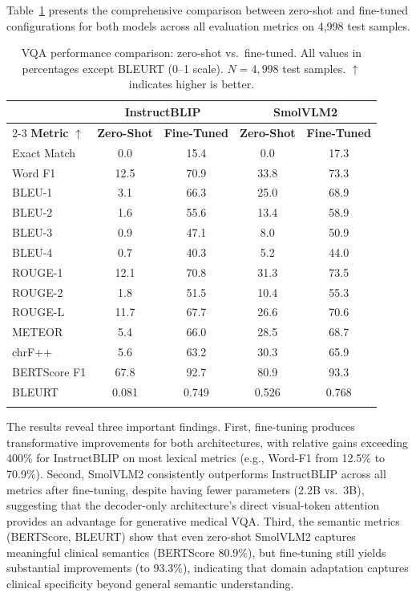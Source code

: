 \documentclass[pdflatex,sn-mathphys-num]{sn-jnl}
\begin{document}
Table~\ref{tab:main_results} presents the comprehensive comparison between zero-shot and fine-tuned configurations for both models across all evaluation metrics on 4,998 test samples.

\begin{table}[t]
\caption{VQA performance comparison: zero-shot vs.\ fine-tuned. All values in percentages except BLEURT (0--1 scale). $N = 4{,}998$ test samples. $\uparrow$ indicates higher is better.}\label{tab:main_results}
\begin{tabular*}{\textwidth}{@{\extracolsep\fill}lcccc}
\toprule
& \multicolumn{2}{c}{\textbf{InstructBLIP}} & \multicolumn{2}{c}{\textbf{SmolVLM2}} \\
\cmidrule{2-3}\cmidrule{4-5}
\textbf{Metric} $\uparrow$ & \textbf{Zero-Shot} & \textbf{Fine-Tuned} & \textbf{Zero-Shot} & \textbf{Fine-Tuned} \\
\midrule
Exact Match & 0.0 & 15.4 & 0.0 & 17.3 \\
Word F1 & 12.5 & 70.9 & 33.8 & 73.3 \\
BLEU-1 & 3.1 & 66.3 & 25.0 & 68.9 \\
BLEU-2 & 1.6 & 55.6 & 13.4 & 58.9 \\
BLEU-3 & 0.9 & 47.1 & 8.0 & 50.9 \\
BLEU-4 & 0.7 & 40.3 & 5.2 & 44.0 \\
ROUGE-1 & 12.1 & 70.8 & 31.3 & 73.5 \\
ROUGE-2 & 1.8 & 51.5 & 10.4 & 55.3 \\
ROUGE-L & 11.7 & 67.7 & 26.6 & 70.6 \\
METEOR & 5.4 & 66.0 & 28.5 & 68.7 \\
chrF++ & 5.6 & 63.2 & 30.3 & 65.9 \\
BERTScore F1 & 67.8 & 92.7 & 80.9 & 93.3 \\
BLEURT & 0.081 & 0.749 & 0.526 & 0.768 \\
\botrule
\end{tabular*}
\end{table}

The results reveal three important findings. First, fine-tuning produces transformative improvements for both architectures, with relative gains exceeding 400\% for InstructBLIP on most lexical metrics (e.g., Word-F1 from 12.5\% to 70.9\%). Second, SmolVLM2 consistently outperforms InstructBLIP across all metrics after fine-tuning, despite having fewer parameters (2.2B vs.\ 3B), suggesting that the decoder-only architecture's direct visual-token attention provides an advantage for generative medical VQA. Third, the semantic metrics (BERTScore, BLEURT) show that even zero-shot SmolVLM2 captures meaningful clinical semantics (BERTScore 80.9\%), but fine-tuning still yields substantial improvements (to 93.3\%), indicating that domain adaptation captures clinical specificity beyond general semantic understanding.
\end{document}
